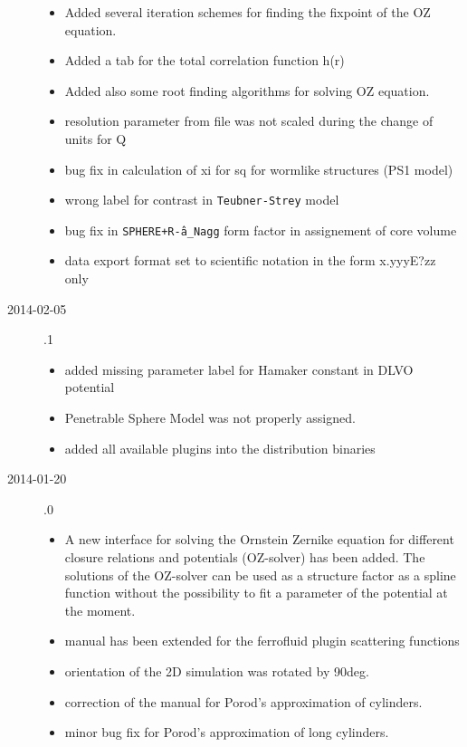 \begin{description}
\begin{itemize}
        \item Added several iteration schemes for finding the fixpoint of the OZ equation.
        \item Added a tab for the total correlation function h(r)
        \item Added also some root finding algorithms for solving OZ equation.
        \item resolution parameter from file was not scaled during the change of units for Q
        \item bug fix in calculation of xi for sq for wormlike structures  (PS1 model)
        \item wrong label for contrast in \texttt{Teubner-Strey} model
        \item bug fix in \texttt{SPHERE+R\^-a\_Nagg} form factor in assignement of core volume
        \item data export format set to scientific notation in the form x.yyyE?zz only
    \end{itemize}
    \item[2014-02-05] .1
    \begin{itemize}
      \item added missing parameter label for Hamaker constant in DLVO potential
      \item Penetrable Sphere Model was not properly assigned.
      \item added all available plugins into the distribution binaries
    \end{itemize}
    \item[2014-01-20] .0
    \begin{itemize}
      \item A new interface for solving the Ornstein Zernike equation for different
            closure relations and potentials (OZ-solver) has been added. The solutions
            of the OZ-solver can be used as a structure factor as a spline function without the possibility to fit a parameter of the potential at the moment.
      \item manual has been extended for the ferrofluid plugin scattering functions
      \item orientation of the 2D simulation was rotated by 90deg.
      \item correction of the manual for Porod's approximation of cylinders.
      \item minor bug fix for Porod's approximation of long cylinders.
    \end{itemize}

\end{description}
